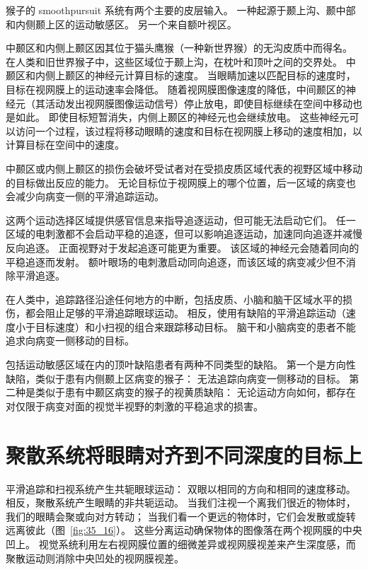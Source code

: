 猴子的 smoothpursuit 系统有两个主要的皮层输入。
一种起源于颞上沟、颞中部和内侧颞上区的运动敏感区。 另一个来自额叶视区。


中颞区和内侧上颞区因其位于猫头鹰猴（一种新世界猴）的无沟皮质中而得名。
在人类和旧世界猴子中，这些区域位于颞上沟，在枕叶和顶叶之间的交界处。
中颞区和内侧上颞区的神经元计算目标的速度。
当眼睛加速以匹配目标的速度时，目标在视网膜上的运动速率会降低。
随着视网膜图像速度的降低，中间颞区的神经元（其活动发出视网膜图像运动信号）停止放电，即使目标继续在空间中移动也是如此。
即使目标短暂消失，内侧上颞区的神经元也会继续放电。
这些神经元可以访问一个过程，该过程将移动眼睛的速度和目标在视网膜上移动的速度相加，以计算目标在空间中的速度。


中颞区或内侧上颞区的损伤会破坏受试者对在受损皮质区域代表的视野区域中移动的目标做出反应的能力。
无论目标位于视网膜上的哪个位置，后一区域的病变也会减少向病变一侧的平滑追踪运动。


这两个运动选择区域提供感官信息来指导追逐运动，但可能无法启动它们。
任一区域的电刺激都不会启动平稳的追逐，但可以影响追逐运动，加速同向追逐并减慢反向追逐。
正面视野对于发起追逐可能更为重要。
该区域的神经元会随着同向的平稳追逐而发射。
额叶眼场的电刺激启动同向追逐，而该区域的病变减少但不消除平滑追逐。


在人类中，追踪路径沿途任何地方的中断，包括皮质、小脑和脑干区域水平的损伤，都会阻止足够的平滑追踪眼球运动。
相反，使用有缺陷的平滑追踪运动（速度小于目标速度）和小扫视的组合来跟踪移动目标。
脑干和小脑病变的患者不能追求向病变一侧移动的目标。


包括运动敏感区域在内的顶叶缺陷患者有两种不同类型的缺陷。
第一个是方向性缺陷，类似于患有内侧颞上区病变的猴子：
无法追踪向病变一侧移动的目标。
第二种是类似于患有中颞区病变的猴子的视黄质缺陷：
无论运动方向如何，都存在对仅限于病变对面的视觉半视野的刺激的平稳追求的损害。



\section{聚散系统将眼睛对齐到不同深度的目标上}

平滑追踪和扫视系统产生共轭眼球运动：
双眼以相同的方向和相同的速度移动。
相反，聚散系统产生眼睛的非共轭运动。
当我们注视一个离我们很近的物体时，我们的眼睛会聚或向对方转动；
当我们看一个更远的物体时，它们会发散或旋转远离彼此（图~\ref{fig:35_16}）。
这些分离运动确保物体的图像落在两个视网膜的中央凹上。
视觉系统利用左右视网膜位置的细微差异或视网膜视差来产生深度感，而聚散运动则消除中央凹处的视网膜视差。


